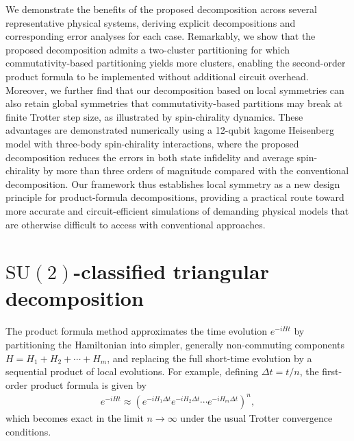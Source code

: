 \documentclass[aps,showpacs,amsmath,amssymb,twocolumn,prx,longbibliography,superscriptaddress,notitlepage,floatfix,10pt]{revtex4-2}
\begin{document}
We demonstrate the benefits of the proposed decomposition across several representative physical systems, deriving explicit decompositions and corresponding error analyses for each case.
Remarkably, we show that the proposed decomposition admits a two-cluster partitioning for which commutativity-based partitioning yields more clusters, enabling the second-order product formula to be implemented without additional circuit overhead.
Moreover, we further find that our decomposition based on local symmetries can also retain global symmetries that commutativity-based partitions may break at finite Trotter step size, as illustrated by spin-chirality dynamics.
These advantages are demonstrated numerically using a 12-qubit kagome Heisenberg model with three-body spin-chirality interactions, where the proposed decomposition reduces the errors in both state infidelity and average spin-chirality by more than three orders of magnitude compared with the conventional decomposition.
Our framework thus establishes local symmetry as a new design principle for product-formula decompositions, providing a practical route toward more accurate and circuit-efficient simulations of demanding physical models that are otherwise difficult to access with conventional approaches.



\section{\texorpdfstring{$\mathrm{SU}(2)$}{SU(2)}-classified triangular decomposition}


The product formula method approximates the time evolution $e^{-iHt}$ by partitioning the Hamiltonian into simpler, generally non-commuting components $H = H_{1}+H_{2}+\cdots+H_{m}$, and replacing the full short-time evolution by a sequential product of local evolutions.
For example, defining $\Delta t = t/n$, the first-order product formula is given by
\begin{equation}
\begin{split}
    e^{-iHt} 
    \approx \left(e^{-iH_{1}\Delta t}e^{-iH_{2}\Delta t}\cdots e^{-iH_{m}\Delta t}\right)^{n},
\end{split}
\end{equation}
which becomes exact in the limit $n\to\infty$ under the usual Trotter convergence conditions.
\end{document}
